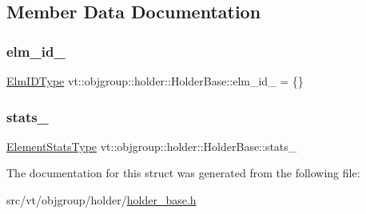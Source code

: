 \subsection{Member Data Documentation}
\mbox{\label{structvt_1_1objgroup_1_1holder_1_1_holder_base_a0302cbe111e4bfa8cc8cd1fc47b39b27}} 
\subsubsection{\texorpdfstring{elm\+\_\+id\+\_\+}{elm\_id\_}}
{\footnotesize\ttfamily \hyperlink{structvt_1_1objgroup_1_1holder_1_1_holder_base_a89c0ce1f23237ab00aee86d4d339bc50}{Elm\+I\+D\+Type} vt\+::objgroup\+::holder\+::\+Holder\+Base\+::elm\+\_\+id\+\_\+ = \{\}\hspace{0.3cm}{\ttfamily [protected]}}

\mbox{\label{structvt_1_1objgroup_1_1holder_1_1_holder_base_a83270e1974b919786da89599cab2a601}} 
\subsubsection{\texorpdfstring{stats\+\_\+}{stats\_}}
{\footnotesize\ttfamily \hyperlink{structvt_1_1objgroup_1_1holder_1_1_holder_base_a2c1e7b13a85838aa6f4385266a20e7d5}{Element\+Stats\+Type} vt\+::objgroup\+::holder\+::\+Holder\+Base\+::stats\+\_\+\hspace{0.3cm}{\ttfamily [protected]}}



The documentation for this struct was generated from the following file\+:\begin{DoxyCompactItemize}
\item 
src/vt/objgroup/holder/\hyperlink{holder__base_8h}{holder\+\_\+base.\+h}\end{DoxyCompactItemize}
